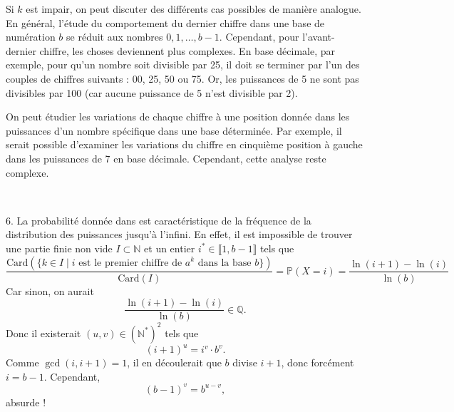 Si $k$ est impair, on peut discuter des diff{\'e}rents cas possibles de
mani{\`e}re analogue. En g{\'e}n{\'e}ral, l'{\'e}tude du comportement du
dernier chiffre dans une base de num{\'e}ration $b$ se r{\'e}duit aux nombres
$0, 1, \ldots, b - 1$. Cependant, pour l'avant-dernier chiffre, les choses
deviennent plus complexes. En base d{\'e}cimale, par exemple, pour qu'un
nombre soit divisible par 25, il doit se terminer par l'un des couples de
chiffres suivants : 00, 25, 50 ou 75. Or, les puissances de 5 ne sont pas
divisibles par 100 (car aucune puissance de 5 n'est divisible par 2).

On peut {\'e}tudier les variations de chaque chiffre {\`a} une position
donn{\'e}e dans les puissances d'un nombre sp{\'e}cifique dans une base
d{\'e}termin{\'e}e. Par exemple, il serait possible d'examiner les variations
du chiffre en cinqui{\`e}me position {\`a} gauche dans les puissances de 7 en
base d{\'e}cimale. Cependant, cette analyse reste complexe.

\

6. La probabilit{\'e} donn{\'e}e dans est caract{\'e}ristique de la
fr{\'e}quence de la distribution des puissances jusqu'{\`a} l'infini. En
effet, il est impossible de trouver une partie finie non vide $I \subset
\mathbb{N}$ et un entier $i^{\ast} \in \llbracket 1, b - 1 \rrbracket$ tels
que
\[
\frac{\text{Card}(\{ k \in I \mid i \text{ est le premier chiffre de } a^k \text{ dans la base } b \})}{\text{Card}(I)}
= \mathbb{P}(X = i) = \frac{\ln(i+1) - \ln(i)}{\ln(b)}
\]
Car sinon, on aurait
\[
\frac{\ln(i+1) - \ln(i)}{\ln(b)} \in \mathbb{Q}.
\]
Donc il existerait \((u, v) \in (\mathbb{N}^*)^2\) tels que
\[
(i+1)^u = i^v \cdot b^v.
\]
Comme \(\gcd(i, i+1) = 1\), il en découlerait que \(b\) divise \(i+1\), donc forcément \(i = b-1\). Cependant,
\[
(b-1)^v = b^{u-v},
\]
absurde !
